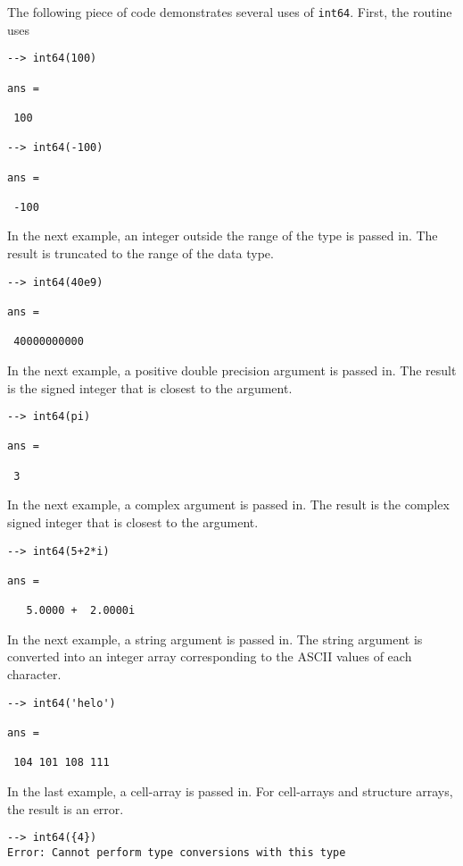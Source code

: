The following piece of code demonstrates several uses of \verb|int64|.  First, the routine uses
\begin{verbatim}
--> int64(100)

ans = 

 100 

--> int64(-100)

ans = 

 -100 
\end{verbatim}
In the next example, an integer outside the range  of the type is passed in.  
The result is truncated to the range of the data type.
\begin{verbatim}
--> int64(40e9)

ans = 

 40000000000 
\end{verbatim}
In the next example, a positive double precision argument is passed in.  The 
result is the signed integer that is closest to the argument.
\begin{verbatim}
--> int64(pi)

ans = 

 3 
\end{verbatim}
In the next example, a complex argument is passed in.  The result is the 
complex signed integer that is closest to the argument.
\begin{verbatim}
--> int64(5+2*i)

ans = 

   5.0000 +  2.0000i 
\end{verbatim}
In the next example, a string argument is passed in.  The string argument is 
converted into an integer array corresponding to the ASCII values of each character.
\begin{verbatim}
--> int64('helo')

ans = 

 104 101 108 111 
\end{verbatim}
In the last example, a cell-array is passed in.  For cell-arrays and structure 
arrays, the result is an error.
\begin{verbatim}
--> int64({4})
Error: Cannot perform type conversions with this type
\end{verbatim}
